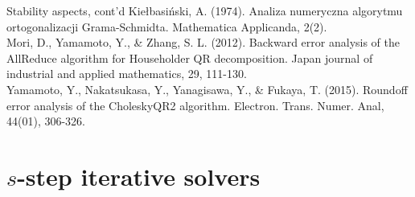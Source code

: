 \documentclass[t,usepdftitle=false]{beamer}
\begin{document}
\begin{frame}{Stability aspects, cont'd}
\tiny{Kiełbasiński, A. (1974). Analiza numeryczna algorytmu ortogonalizacji Grama-Schmidta. Mathematica Applicanda, 2(2).$\!\!$}\tinyskip\\
\tiny{Mori, D., Yamamoto, Y., \& Zhang, S. L. (2012). Backward error analysis of the AllReduce algorithm for Householder QR decomposition. Japan journal of industrial and applied mathematics, 29, 111-130.}\tinyskip\\
\tiny{Yamamoto, Y., Nakatsukasa, Y., Yanagisawa, Y., \& Fukaya, T. (2015). Roundoff error analysis of the CholeskyQR2 algorithm. Electron. Trans. Numer. Anal, 44(01), 306-326.}
\end{frame}

\section{$s$-step iterative solvers}
\end{document}
